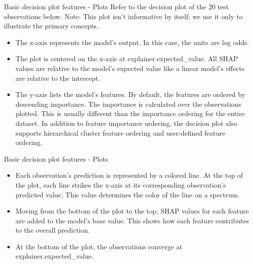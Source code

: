 \documentclass[aspectratio=169]{beamer}
\begin{document}
\begin{frame}{Basic decision plot features - Plots}
    Refer to the decision plot of the 20 test observations below. Note: This plot isn’t informative by itself; we use it only to illustrate the primary concepts.
    \begin{itemize}
        \item The x-axis represents the model’s output. In this case, the units are log odds.
        \item The plot is centered on the x-axis at explainer.expected\_value. All \ac{SHAP} values are relative to the model’s expected value like a linear model’s effects are relative to the intercept.
        \item The y-axis lists the model’s features. By default, the features are ordered by descending importance. The importance is calculated over the observations plotted. This is usually different than the importance ordering for the entire dataset. In addition to feature importance ordering, the decision plot also supports hierarchical cluster feature ordering and user-defined feature ordering.
    \end{itemize}
\end{frame}

\begin{frame}{Basic decision plot features - Plots}
    \begin{itemize}
        \item Each observation’s prediction is represented by a colored line. At the top of the plot, each line strikes the x-axis at its corresponding observation’s predicted value. This value determines the color of the line on a spectrum.
        \item Moving from the bottom of the plot to the top, \ac{SHAP} values for each feature are added to the model’s base value. This shows how each feature contributes to the overall prediction. 
        \item At the bottom of the plot, the observations converge at explainer.expected\_value.
    \end{itemize}
\end{frame}
\end{document}
